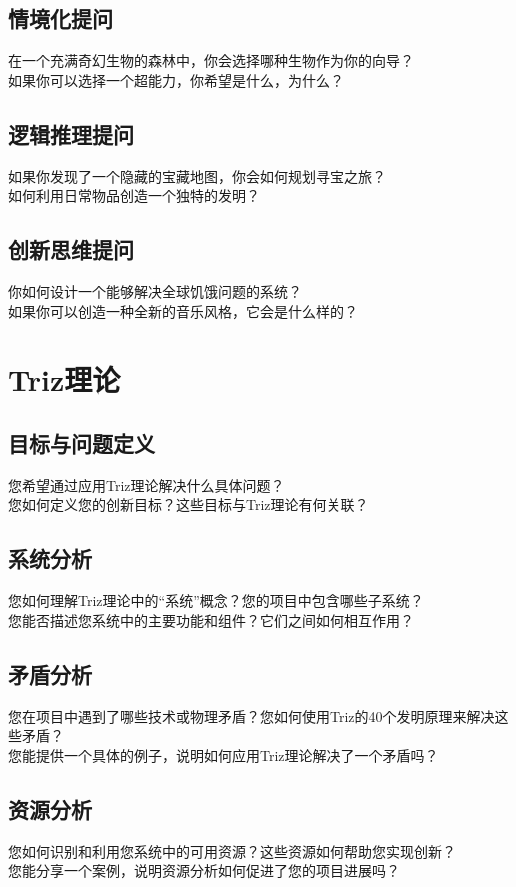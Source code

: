 \documentclass[12pt]{book}
\begin{document}
\subsection{情境化提问}
在一个充满奇幻生物的森林中，你会选择哪种生物作为你的向导？\\
如果你可以选择一个超能力，你希望是什么，为什么？\\

\subsection{逻辑推理提问}
如果你发现了一个隐藏的宝藏地图，你会如何规划寻宝之旅？\\
如何利用日常物品创造一个独特的发明？\\

\subsection{创新思维提问}
你如何设计一个能够解决全球饥饿问题的系统？\\
如果你可以创造一种全新的音乐风格，它会是什么样的？\\

\section{Triz理论}
\subsection{目标与问题定义}
您希望通过应用Triz理论解决什么具体问题？\\
您如何定义您的创新目标？这些目标与Triz理论有何关联？\\
\subsection{系统分析}
您如何理解Triz理论中的“系统”概念？您的项目中包含哪些子系统？\\
您能否描述您系统中的主要功能和组件？它们之间如何相互作用？\\
\subsection{矛盾分析}
您在项目中遇到了哪些技术或物理矛盾？您如何使用Triz的40个发明原理来解决这些矛盾？\\
您能提供一个具体的例子，说明如何应用Triz理论解决了一个矛盾吗？\\
\subsection{资源分析}
您如何识别和利用您系统中的可用资源？这些资源如何帮助您实现创新？\\
您能分享一个案例，说明资源分析如何促进了您的项目进展吗？\\
\end{document}
